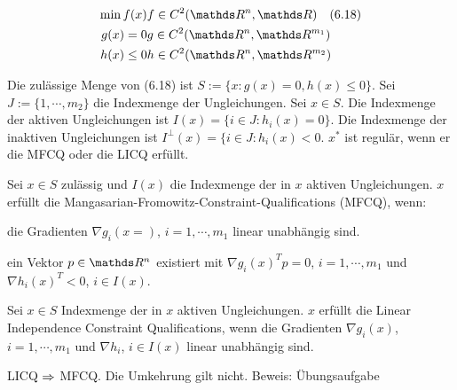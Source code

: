 \begin{align*}
\min f(x) & f \in C^2(\R^n, \R) \quad (6.18)\\
g(x)=0 & g \in C^2(\R^n, \R^{m_1}) \\
h(x) \leq 0 & h \in C^2(\R^n, \R^{m_2}) \\
\end{align*}

Die zulässige Menge von (6.18) ist $S := \{x: g(x)=0, h(x) \leq 0 \}$. Sei $J := \{1,\cdots,m_2\}$ die Indexmenge der Ungleichungen. Sei $x \in S$. Die Indexmenge der aktiven Ungleichungen ist $I(x) = \{i\in J : h_i(x) = 0\}$. Die Indexmenge der inaktiven Ungleichungen ist $I^\perp (x) = \{ i \in J: h_i(x) < 0$. $x^*$ ist regulär, wenn er die MFCQ oder die LICQ erfüllt.


Sei $x \in S$ zulässig und $I(x)$ die Indexmenge der in $x$ aktiven Ungleichungen. $x$ erfüllt die Mangasarian-Fromowitz-Constraint-Qualifications (MFCQ), wenn:

\bitm
\item die Gradienten $\nabla g_i(x=)$, $i=1,\cdots, m_1$ linear unabhängig sind.
\item ein Vektor $p \in \R^n$ existiert mit $\nabla g_i(x)^T p = 0$, $i=1,\cdots,m_1$ und $\nabla h_i(x)^T < 0$, $i \in I(x)$.
\eitm


Sei $x\in S$ Indexmenge der in $x$ aktiven Ungleichungen. $x$ erfüllt die Linear Independence Constraint Qualifications, wenn die Gradienten $\nabla g_i(x)$, $i=1,\cdots,m_1$ und $\nabla h_i$, $i \in I(x)$ linear unabhängig sind.


LICQ $\Rightarrow$ MFCQ. Die Umkehrung gilt nicht. Beweis: Übungsaufgabe






